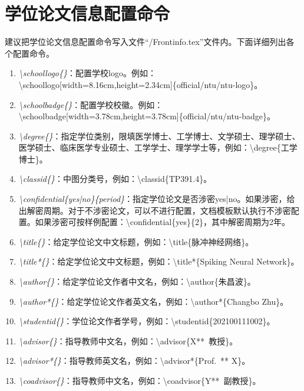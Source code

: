  \section{\projectname 学位论文信息配置命令}
 建议把学位论文信息配置命令写入文件“\projectname /Frontinfo.tex”文件内。下面详细列出各个配置命令。
 \begin{enumerate}
    \item \emph{\backslash schoollogo\{\}}：配置学校logo。例如：\newline \backslash schoollogo[width=8.16cm,height=2.34cm]\{official/ntu/ntu-logo\}。
    \item \emph{\backslash schoolbadge\{\}}：配置学校校徽。例如：\newline \backslash schoolbadge[width=3.78cm,height=3.78cm]\{official/ntu/ntu-badge\}。
    \item \emph{\backslash degree\{\}}：指定学位类别，限填医学博士、工学博士、文学硕士、理学硕士、医学硕士、临床医学专业硕士、工学学士、理学学士等，例如：\backslash degree\{工学博士\}。
    \item \emph{\backslash classid\{\}}：中图分类号，例如：\backslash classid\{TP391.4\}。
    \item \emph{\backslash confidential\{yes|no\}\{period\}}：指定学位论文是否涉密yes|no。如果涉密，给出解密周期。对于不涉密论文，可以不进行配置，文档模板默认执行不涉密配置。如果涉密可按样例配置：\backslash confidential\{yes\}\{2\}，其中解密周期为2年。
    \item \emph{\backslash title\{\}}：给定学位论文中文标题，例如：\backslash title\{脉冲神经网络\}。
    \item \emph{\backslash title*\{\}}：给定学位论文中文标题，例如：\backslash title*\{Spiking Neural Network\}。
    \item \emph{\backslash author\{\}}：给定学位论文作者中文名，例如：\backslash author\{朱昌波\}。
    \item \emph{\backslash author*\{\}}：给定学位论文作者英文名，例如：\backslash author*\{Changbo Zhu\}。
    \item \emph{\backslash studentid\{\}}：学位论文作者学号，例如：\backslash studentid\{202100111002\}。
    \item \emph{\backslash advisor\{\}}：指导教师中文名，例如：\backslash advisor\{X**~教授\}。
    \item \emph{\backslash advisor*\{\}}：指导教师英文名，例如：\backslash advisor*\{Prof.~** X\}。
    \item \emph{\backslash coadvisor\{\}}：指导教师中文名，例如：\backslash coadvisor\{Y**~副教授\}。

\end{enumerate}
